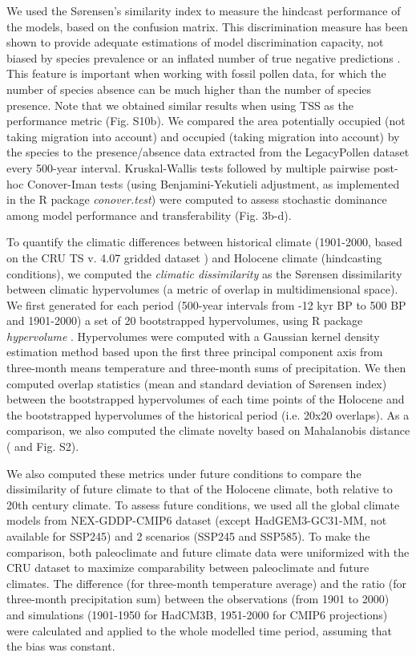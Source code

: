 \documentclass[9pt,twocolumn,twoside]{pnas-new}
\begin{document}
{We used the Sørensen's similarity index to measure the hindcast performance of the models, based on the confusion matrix. This discrimination measure has been shown to provide adequate estimations of model discrimination capacity,  not biased by species prevalence or an inflated number of true negative predictions \cite{Leroy2018}. This feature is important when working with fossil pollen data, for which the number of species absence can be much higher than the number of species presence. Note that we obtained similar results when using TSS as the performance metric (Fig. S10b). We compared the area potentially occupied (not taking migration into account) and occupied (taking migration into account) by the species to the presence/absence data extracted from the LegacyPollen dataset every 500-year interval. Kruskal-Wallis tests followed by multiple pairwise post-hoc Conover-Iman tests (using Benjamini-Yekutieli adjustment, as implemented in the R package \emph{conover.test}) were computed to assess stochastic dominance among model performance and transferability (Fig. 3b-d).

To quantify the climatic differences between  historical climate (1901-2000, based on the CRU TS v. 4.07 gridded dataset \cite{Harris2020}) and Holocene climate (hindcasting conditions), we computed the \emph{climatic dissimilarity} as the Sørensen dissimilarity between climatic hypervolumes (a metric of overlap in multidimensional space). We first generated for each period (500-year intervals from -12 kyr BP to 500 BP and 1901-2000) a set of 20 bootstrapped hypervolumes, using R package \emph{hypervolume} \cite{Blonder2018}. Hypervolumes were computed with a Gaussian kernel density estimation method based upon the first three principal component axis from three-month means temperature and three-month sums of precipitation. We then computed overlap statistics (mean and standard deviation of Sørensen index) between the bootstrapped hypervolumes of each time points of the Holocene and the bootstrapped hypervolumes of the historical period (i.e. 20x20 overlaps). As a comparison, we also computed the climate novelty based on Mahalanobis distance (\cite{Burke2019} and Fig. S2). 

We also computed these metrics under future conditions to compare the dissimilarity of future climate to that of  the Holocene climate, both relative to 20th century climate. To assess future conditions, we used all the global climate models from NEX-GDDP-CMIP6 dataset \cite{Thrasher2022} (except HadGEM3-GC31-MM, not available for SSP245) and 2 scenarios (SSP245 and SSP585). To make the comparison, both paleoclimate and future climate data were uniformized with the CRU dataset to maximize comparability between paleoclimate and future climates. The difference (for three-month temperature average) and the ratio (for three-month precipitation sum) between the observations (from 1901 to 2000) and simulations (1901-1950 for HadCM3B, 1951-2000 for CMIP6 projections) were calculated and applied to the whole modelled time period, assuming that the bias was constant. 

}
\end{document}
